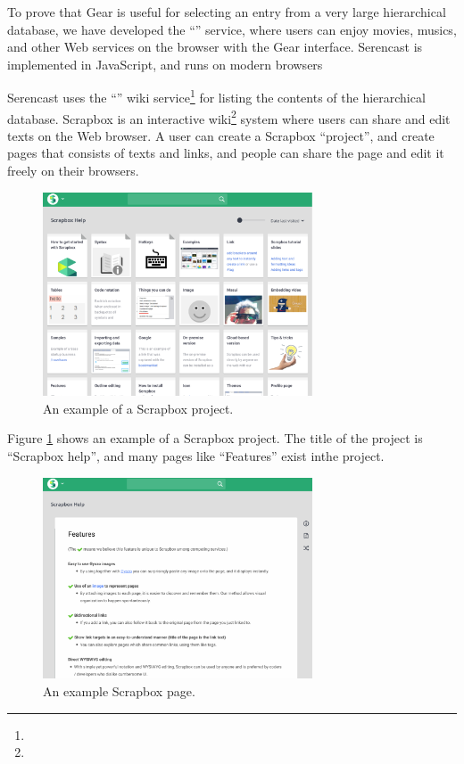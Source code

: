 \documentclass{article}
\def\SC{\textsf{\small Serencast}}
\def\SB{\textsf{\small Scrapbox}}
\begin{document}
To prove that Gear is useful for selecting an entry from a very
large hierarchical database,
we have developed the ``'' service, where
users can enjoy movies, musics, and other Web services
on the browser with the Gear interface.
{\SC} is implemented in JavaScript, and runs on modern browsers 

{\SC} uses the ``'' wiki service\footnote{
} for listing the contents of the hierarchical database.
{\SB} is an interactive wiki\footnote{
} system where users can share and edit texts on the Web browser.
A user can create a {\SB} ``project'', and create pages
that consists of texts and links,
and people can share the page and edit it freely on their browsers.

\begin{figure}[H]
\centerline{\includegraphics[width=80mm,bb=0 0 1553 1174]{figures/28818d749896f87f3eb8bd6b6f9e9a36.png}}
\caption{An example of a {\SB} project.}
\label{exampleproject}
\end{figure}

Figure \ref{exampleproject} shows an example of a {\SB} project.
The title of the project is ``Scrapbox help'', and
many pages like ``Features'' exist inthe project.

\begin{figure}[H]
\centerline{\includegraphics[width=80mm,bb=0 0 1606 1200]{figures/9e867c325bafc415bd0870c1717fbaf7.png}}
\caption{An example {\SB} page.}
\label{examplepage}
\end{figure}
\end{document}

